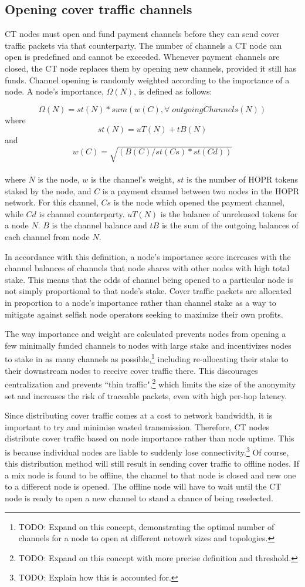 \subsection{Opening cover traffic channels}
\label{sec:ct:channelopen}

CT nodes must open and fund payment channels before they can send cover traffic packets via that counterparty. The number of channels a CT node can open is predefined and cannot be exceeded. Whenever payment channels are closed, the CT node replaces them by opening new channels, provided it still has funds. Channel opening is randomly weighted according to the importance of a node. A node's importance, $\Omega(N)$, is defined as follows:

$$\Omega(N) = st(N) * sum(w(C), \forall \; outgoingChannels(N))$$
where
$$st(N) = uT(N) + tB(N)$$
and
$$w(C) = \sqrt{(B(C) / st(Cs) * st(Cd))}$$
\\
where $N$ is the node, $w$ is the channel's weight, $st$ is the number of HOPR tokens staked by the node, and $C$ is a payment channel between two nodes in the HOPR network. For this channel, $Cs$ is the node which opened the payment channel, while $Cd$ is channel counterparty. $uT(N)$ is the balance of unreleased tokens for a node $N$. $B$ is the channel balance and $tB$ is the sum of the outgoing balances of each channel from node $N$.

In accordance with this definition, a node's importance score increases with the channel balances of channels that node shares with other nodes with high total stake. This means that the odds of channel being opened to a particular node is not simply proportional to that node’s stake. Cover traffic packets are allocated in proportion to a node's importance rather than channel stake as a way to mitigate against selfish node operators seeking to maximize their own profits.

The way importance and weight are calculated prevents nodes from opening a few minimally funded channels to nodes with large stake and incentivizes nodes to stake in as many channels as possible,\footnote{TODO: Expand on this concept, demonstrating the optimal number of channels for a node to open at different netowrk sizes and topologies.} including re-allocating their stake to their downstream nodes to receive cover traffic there. This discourages centralization and prevents ``thin traffic",\footnote{TODO: Expand on this concept with more precise definition and threshold.} which limits the size of the anonymity set and increases the risk of traceable packets, even with high per-hop latency.

Since distributing cover traffic comes at a cost to network bandwidth, it is important to try and minimise wasted transmission. Therefore, CT nodes distribute cover traffic based on node importance rather than node uptime. This is because individual nodes are liable to suddenly lose connectivity.\footnote{TODO: Explain how this is accounted for.} Of course, this distribution method will still result in sending cover traffic to offline nodes. If a mix node is found to be offline, the channel to that node is closed and new one to a different node is opened. The offline node will have to wait until the CT node is ready to open a new channel to stand a chance of being reselected.